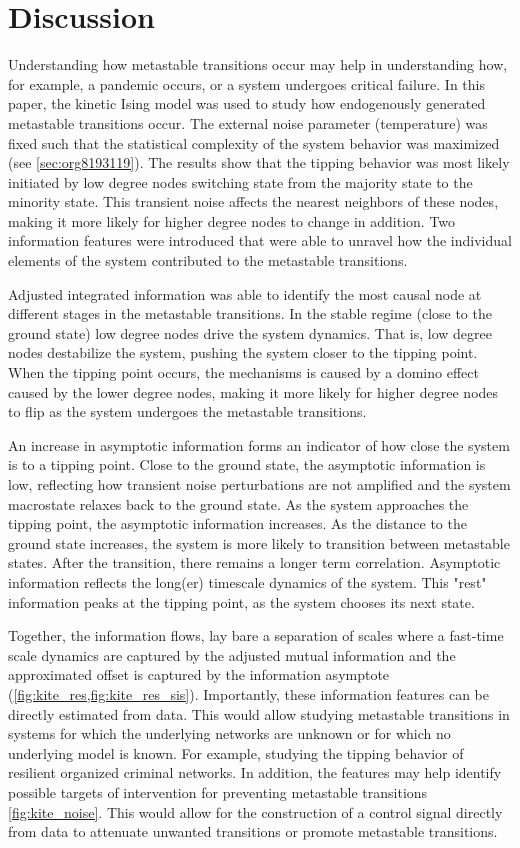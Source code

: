 \documentclass[a4paper, 11pt, twocolumn]{article}
\begin{document}
\section{Discussion}
\label{sec:org389dbab}
Understanding how  metastable transitions occur may  help in
understanding  how, for  example,  a pandemic  occurs, or  a
system  undergoes  critical  failure.  In  this  paper,  the
kinetic  Ising  model  was  used  to  study  how endogenously generated metastable transitions occur. The external noise parameter (temperature) was fixed such that the statistical  complexity of the system behavior was maximized (see \ref{sec:org8193119}). The results show that the tipping behavior was most likely initiated by low degree nodes switching state from the majority state to the minority state. This transient noise affects the nearest neighbors of these nodes, making it more likely for higher degree nodes to change in addition. Two information features were introduced that were able to unravel how the individual elements of the system contributed to the metastable transitions.

Adjusted integrated information was able to identify the most causal node at different stages in the metastable transitions. In the stable regime (close to the ground state) low degree nodes drive the system dynamics. That is, low degree nodes destabilize the system, pushing the system closer to the tipping point. When the tipping point occurs, the mechanisms is caused by a domino effect caused by the lower degree nodes, making it more likely for higher degree nodes to flip as the system undergoes the metastable transitions.

An increase in asymptotic information forms an indicator of how close the system is to a tipping point. Close to the ground state, the asymptotic information is low, reflecting how transient noise perturbations are not amplified and the system macrostate relaxes back to the ground state. As the system approaches the tipping point, the asymptotic information increases. As the distance to the ground state increases, the system is more likely to transition between metastable states. After the transition, there remains a longer term correlation. Asymptotic information reflects the long(er) timescale dynamics of the system. This "rest" information peaks at the tipping point, as the system chooses its next state.

Together, the  information flows, lay bare
a separation of scales where  a fast-time scale dynamics are
captured  by   the  adjusted  mutual  information   and  the
approximated offset is captured by the information asymptote
(\cref{fig:kite_res,fig:kite_res_sis}).   Importantly, these information features can be directly estimated from data. This would allow studying metastable transitions in systems for which the underlying networks are unknown or for which no underlying model is known. For example, studying the tipping behavior of resilient organized criminal networks. In addition, the features may help identify possible targets of intervention for preventing metastable transitions \cref{fig:kite_noise}. This would allow for the construction of a control signal directly from data to attenuate unwanted transitions or promote metastable transitions.
\end{document}
